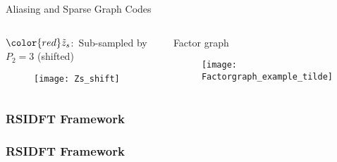 \begin{frame}{Aliasing and Sparse Graph Codes}
{\begin{columns}
		\begin{block}{{\small$\color{red}\tilde{z}_s$:\ Sub-sampled by $P_2=3$ ({\color{blue}shifted})}}
			\begin{figure}[t]
				\centering
				\texttt{[image: Zs\_shift]}
			\end{figure}
		\end{block}
		
		\begin{block}{\small Factor graph}
			\begin{figure}[t]
				\centering
				\texttt{[image: Factorgraph\_example\_tilde]}
			\end{figure}
		\end{block}
	\end{columns}}
		
	\end{frame}

\begin{frame}\frametitle{RSIDFT Framework}
	
		\begin{figure}[t!]
			\begin{center}
				\resizebox{0.8\textwidth}{!}{}
			\end{center}	
			\label{fig:rsidft}
			\vspace{5 pt}
		\end{figure}
\end{frame}


\begin{frame}\frametitle{RSIDFT Framework}
	\begin{columns}
\begin{figure}[t!]
	\begin{center}
		\resizebox{1.05\textwidth}{0.7\textheight}{}
		\end{center}	
		\label{fig:rsidft}
		\vspace{5 pt}
		\end{figure}
		\begin{figure}[h!]
			\begin{center}
				\resizebox{1.0\textwidth}{0.65\textheight}{}	
			\end{center}	
			\vspace{5 pt}
		\end{figure}
		
	\end{columns}
	
\end{frame}


